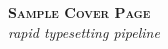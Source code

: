 \begin{titlepage}
	\hspace{0pt}
	\vfill
	\noindent
	{\Huge\textsc{\textbf{Sample Cover Page}}}\\[2\baselineskip]
	{\large\textit{rapid typesetting pipeline}}\\[4\baselineskip]
	\vfill
	\hspace{0pt}
\end{titlepage}